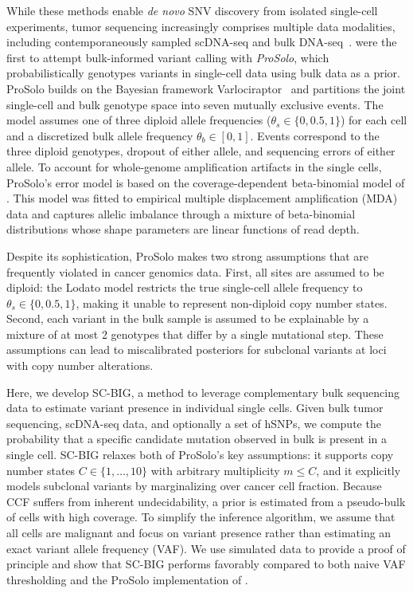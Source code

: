 \documentclass[10pt]{article}
\begin{document}
While these methods enable \textit{de novo} SNV discovery from isolated single-cell experiments, tumor sequencing increasingly comprises multiple data modalities, including contemporaneously sampled scDNA-seq and bulk DNA-seq~\cite{rozenblatt-rosen2020,leighton2023,chen2025,zhang2023}.
\textcite{lahnemann2021} were the first to attempt bulk-informed variant calling with \textit{ProSolo}, which probabilistically genotypes variants in single-cell data using bulk data as a prior.
ProSolo builds on the Bayesian framework Varlociraptor~\cite{koester2020} and partitions the joint single-cell and bulk genotype space into seven mutually exclusive events.
The model assumes one of three diploid allele frequencies ($\theta_s \in \{0, 0.5, 1\}$) for each cell and a discretized bulk allele frequency $\theta_b \in [0,1]$.
Events correspond to the three diploid genotypes, dropout of either allele, and sequencing errors of either allele.
To account for whole-genome amplification artifacts in the single cells, ProSolo's error model is based on the coverage-dependent beta-binomial model of \textcite{lodato2015}.
This model was fitted to empirical multiple displacement amplification (MDA) data and captures allelic imbalance through a mixture of beta-binomial distributions whose shape parameters are linear functions of read depth.

Despite its sophistication, ProSolo makes two strong assumptions that are frequently violated in cancer genomics data.
First, all sites are assumed to be diploid: the Lodato model restricts the true single-cell allele frequency to $\theta_s \in \{0, 0.5, 1\}$, making it unable to represent non-diploid copy number states.
Second, each variant in the bulk sample is assumed to be explainable by a mixture of at most 2 genotypes that differ by a single mutational step.
These assumptions can lead to miscalibrated posteriors for subclonal variants at loci with copy number alterations.

Here, we develop SC-BIG, a method to leverage complementary bulk sequencing data to estimate variant presence in individual single cells.
Given bulk tumor sequencing, scDNA-seq data, and optionally a set of hSNPs, we compute the probability that a specific candidate mutation observed in bulk is present in a single cell.
SC-BIG relaxes both of ProSolo's key assumptions: it supports copy number states $C \in \{1, \ldots, 10\}$ with arbitrary multiplicity $m \leq C$, and it explicitly models subclonal variants by marginalizing over cancer cell fraction.
Because CCF suffers from inherent undecidability, a prior is estimated from a pseudo-bulk of cells with high coverage.
To simplify the inference algorithm, we assume that all cells are malignant and focus on variant presence rather than estimating an exact variant allele frequency (VAF).
We use simulated data to provide a proof of principle and show that SC-BIG performs favorably compared to both naive VAF thresholding and the ProSolo implementation of \textcite{lahnemann2021}.
\end{document}
